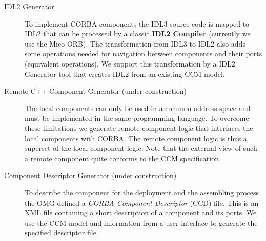 \begin{description}
\item [IDL2 Generator]
To implement CORBA components the IDL3 source code is mapped to IDL2 that can
be processed by a classic {\bf IDL2 Compiler} (currently we use the Mico ORB). 
The transformation from IDL3 to IDL2 also adds some operations needed for 
navigation between components and their ports (equivalent operations). 
We support this transformation by a IDL2 Generator tool that creates IDL2 from 
an existing CCM model.

\item [Remote C++ Component Generator (under construction)]
The local components can only be used in a common address space and
must be implemented in the same programming language. To overcome these
limitations we generate remote component logic that interfaces the local
components with CORBA. The remote component logic is thus a superset of the
local component logic.
Note that the external view of such a remote component quite conforms to the CCM 
specification. 

\item [Component Descriptor Generator (under construction)]
To describe the component for the deployment and the assembling process the OMG
defined a {\it CORBA Component Descriptor} (CCD) file. This is an XML file
containing a short description of a component and its ports. 
We use the CCM model and information from a user interface to generate
the specified descriptor file. 

\end{description}



